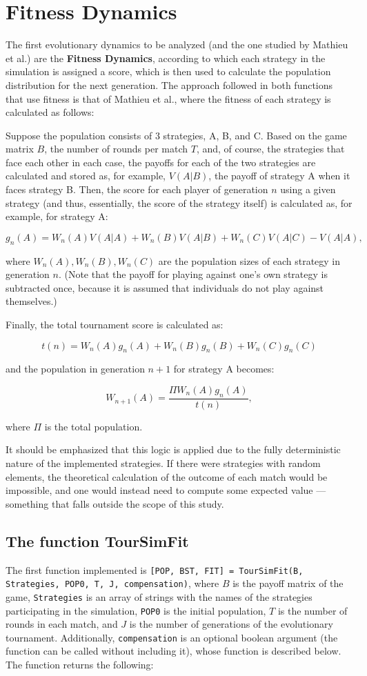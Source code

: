 \section{Fitness Dynamics}

The first evolutionary dynamics to be analyzed (and the one studied by Mathieu et al.) are the \textbf{Fitness Dynamics}, according to which each strategy in the simulation is assigned a score, which is then used to calculate the population distribution for the next generation. The approach followed in both functions that use fitness is that of Mathieu et al., where the fitness of each strategy is calculated as follows:

Suppose the population consists of 3 strategies, A, B, and C. Based on the game matrix $B$, the number of rounds per match $T$, and, of course, the strategies that face each other in each case, the payoffs for each of the two strategies are calculated and stored as, for example, $V(A|B)$, the payoff of strategy A when it faces strategy B. Then, the score for each player of generation $n$ using a given strategy (and thus, essentially, the score of the strategy itself) is calculated as, for example, for strategy A:

\[
g_n(A) = W_n(A)V(A|A) + W_n(B)V(A|B) + W_n(C)V(A|C) - V(A|A),
\]

where $W_n(A), W_n(B), W_n(C)$ are the population sizes of each strategy in generation $n$. (Note that the payoff for playing against one’s own strategy is subtracted once, because it is assumed that individuals do not play against themselves.)

Finally, the total tournament score is calculated as:

\[
t(n) = W_n(A)g_n(A) + W_n(B)g_n(B) + W_n(C)g_n(C)
\]

and the population in generation $n+1$ for strategy A becomes:

\[
W_{n+1}(A) = \frac{\Pi W_n(A)g_n(A)}{t(n)},
\]

where $\Pi$ is the total population.

It should be emphasized that this logic is applied due to the fully deterministic nature of the implemented strategies. If there were strategies with random elements, the theoretical calculation of the outcome of each match would be impossible, and one would instead need to compute some expected value --- something that falls outside the scope of this study.
\subsection{The function TourSimFit}
The first function implemented is \texttt{[POP, BST, FIT] = TourSimFit(B, Strategies, POP0, T, J, compensation)}, where $B$ is the payoff matrix of the game, \texttt{Strategies} is an array of strings with the names of the strategies participating in the simulation, \texttt{POP0} is the initial population, $T$ is the number of rounds in each match, and $J$ is the number of generations of the evolutionary tournament. Additionally, \texttt{compensation} is an optional boolean argument (the function can be called without including it), whose function is described below. The function returns the following:

